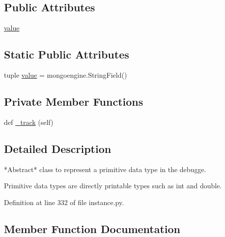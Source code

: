 \subsection*{Public Attributes}
\begin{DoxyCompactItemize}
\item 
\hyperlink{classmemoryoracle_1_1instance_1_1Primitive_ac1e638f21743430e98c2e3513a4556ed}{value}
\end{DoxyCompactItemize}
\subsection*{Static Public Attributes}
\begin{DoxyCompactItemize}
\item 
tuple \hyperlink{classmemoryoracle_1_1instance_1_1Primitive_adf984d6f1bfc101cdef835b137adef55}{value} = mongoengine.\+String\+Field()
\end{DoxyCompactItemize}
\subsection*{Private Member Functions}
\begin{DoxyCompactItemize}
\item 
def \hyperlink{classmemoryoracle_1_1instance_1_1Primitive_a68562bda9732e33fe32188597e2f4b91}{\+\_\+track} (self)
\end{DoxyCompactItemize}


\subsection{Detailed Description}
\begin{DoxyVerb}*Abstract* class to represent a primitive data type in the debugge.

Primitive data types are directly printable types such as int and double.
\end{DoxyVerb}
 

Definition at line 332 of file instance.\+py.



\subsection{Member Function Documentation}
\hypertarget{classmemoryoracle_1_1instance_1_1Primitive_a68562bda9732e33fe32188597e2f4b91}{}
